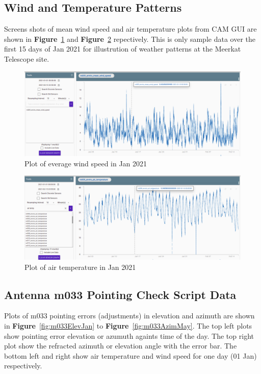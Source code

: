 \documentclass{article}
\begin{document}
\subsection{Wind and Temperature Patterns  }
Screens shots of mean wind speed and air temperature plots from CAM GUI are shown in \textbf{Figure}~\ref{fig:wind1} and \textbf{Figure}~\ref{fig:temp1} repectively.  This is only sample data over the first 15 days of Jan 2021 for illustrution of weather patterns at the Meerkat Telescope site.

\begin{figure}[H]
	\centering
	\includegraphics[scale=0.33]{m009_wind_Jan_partten.png}
	
	\caption{Plot of everage wind speed  in Jan 2021}
	\label{fig:wind1}
\end{figure}
\begin{figure}[H]
	\centering
	\includegraphics[scale=0.33]{m009_Jan_air_tep.png}
	
	\caption{Plot of air temperature in Jan 2021}
	\label{fig:temp1}
\end{figure}



\subsection{Antenna m033 Pointing Check Script Data  }
Plots of m033 pointing errors (adjustments) in elevation and azimuth are shown in \textbf{Figure}~\ref{fig:m033ElevJan} to \textbf{Figure}~\ref{fig:m033AzimMay}.  The top left plots show pointing error elevation or azumuth againts time of the day.  The top right plot show the refracted azimuth or elevation angle with the error bar.   The bottom left and right show air temperature and wind speed for one day (01 Jan) respectively.
\end{document}
